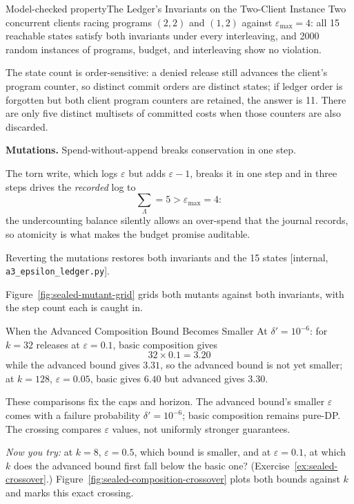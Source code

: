\documentclass[11pt,a4paper]{article}
\theoremstyle{definition}
\begin{document}
\begin{pdclaim}{Model-checked property}{The Ledger's Invariants on the Two-Client Instance}
\label{prop:sealed-ledger-checked}
\setlength{\parskip}{4pt plus 1pt}
Two concurrent clients racing programs $(2,2)$ and $(1,2)$ against
$\varepsilon_{\max}=4$: all 15 reachable states satisfy both invariants under
every interleaving, and 2000 random instances of programs, budget, and
interleaving show no violation.

The state count is order-sensitive: a denied
release still advances the client's program counter, so distinct commit orders
are distinct states; if ledger order is forgotten but both client program counters are retained,
the answer is 11. There are only five distinct multisets of committed costs
when those counters are also discarded.

{
\textbf{Mutations.}
Spend-without-append breaks conservation in one step.\par}

The torn write, which
logs $\varepsilon$ but adds $\varepsilon-1$, breaks it in one step and in three
steps drives the \emph{recorded} log to \[
\sum_\Lambda=5>\varepsilon_{\max}=4:
\]
the undercounting balance silently allows an over-spend that the journal
records, so atomicity is what makes the budget promise auditable.

Reverting the mutations restores
both invariants and the 15 states [internal, \texttt{a3\_epsilon\_ledger.py}].
\end{pdclaim}

Figure~\ref{fig:sealed-mutant-grid} grids both mutants against both
invariants, with the step count each is caught in.



\begin{pdexample}{When the Advanced Composition Bound Becomes Smaller}
\setlength{\parskip}{4pt plus 1pt}
At $\delta'=10^{-6}$: for $k=32$ releases at $\varepsilon=0.1$, basic
composition gives
\[
32\times 0.1=3.20
\]
while the advanced bound gives $3.31$, so
the advanced bound is not yet smaller; at $k=128$, $\varepsilon=0.05$, basic
gives $6.40$ but advanced gives $3.30$.

These comparisons fix the caps and horizon. The advanced bound's smaller
$\varepsilon$ comes with a failure probability $\delta'=10^{-6}$; basic
composition remains pure-DP.
The crossing compares $\varepsilon$ values, not uniformly stronger guarantees.

\emph{Now you try:} at $k=8$,
$\varepsilon=0.5$, which bound is smaller, and at $\varepsilon=0.1$, at which
$k$ does the advanced bound first fall below the basic one?
(Exercise~\ref{ex:sealed-crossover}.)
Figure~\ref{fig:sealed-composition-crossover} plots both bounds against $k$
and marks this exact crossing.
\end{pdexample}
\end{document}
